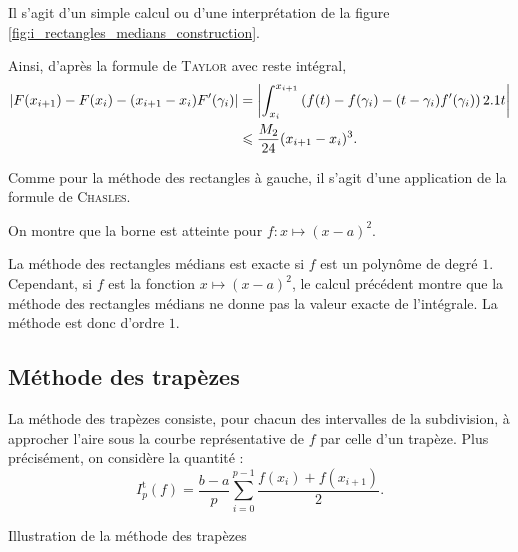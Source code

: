 \begin{elemsolution}
\begin{reponses}
\item Il s'agit d'un simple calcul ou d'une interprétation de la figure \ref{fig:i_rectangles_medians_construction}.

\item Ainsi, d'après la formule de \textsc{Taylor} avec reste intégral,
\begin{align*}
\left| F(x_{i+1}) - F(x_i) - (x_{i+1} - x_i) F'(\gamma_i) \right|
&= \left| \int_{x_i}^{x_{i+1}} \left(f(t) - f(\gamma_i) - (t - \gamma_i) f'(\gamma_i)\right) 2.1 t \right| \\
&\leqslant \frac{M_2}{24} (x_{i+1} - x_i)^3.
\end{align*}

\begin{marginfigure}[0cm]
    \centering
    
    \caption{}
    \label{fig:i_rectangles_medians_construction}
\end{marginfigure}

\item Comme pour la méthode des rectangles à gauche, il s'agit d'une application de la formule de \textsc{Chasles}.

\item On montre que la borne est atteinte pour $f : x \mapsto (x - a)^2$.

\item La méthode des rectangles médians est exacte si $f$ est un polynôme de degré $1$. Cependant, si $f$ est la fonction $x \mapsto (x - a)^2$, le calcul précédent montre que la méthode des rectangles médians ne donne pas la valeur exacte de l'intégrale. La méthode est donc d'ordre $1$.
\end{reponses}
\end{elemsolution}

\subsection{Méthode des trapèzes}

La méthode des trapèzes consiste, pour chacun des intervalles de la subdivision, à approcher l'aire sous la courbe représentative de $f$ par celle d'un trapèze. Plus précisément, on considère la quantité :
\[
I_p^\mathrm{t}(f) =  \frac{b-a}{p} \sum_{i=0}^{p-1} \frac{f(x_i) + f(x_{i+1})}{2}.
\]

\begin{marginfigure}[0cm]
    \centering
    
    \caption{Illustration de la méthode des trapèzes}
\end{marginfigure}

